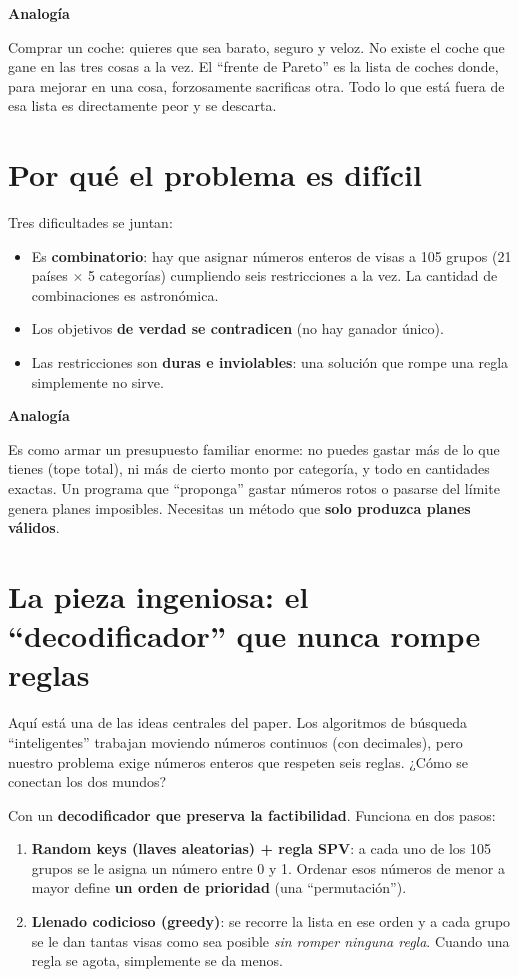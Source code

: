 \documentclass[11pt]{article}
\newcommand{\cajacolor}{cajadato}
\newenvironment{caja}[2]{%
  \par\medskip\noindent
  \renewcommand{\cajacolor}{#1}%
  \begin{lrbox}{\cajabox}%
  \begin{minipage}{\dimexpr\linewidth-2\fboxsep-1.2em\relax}%
  \setlength{\parskip}{0.5em}%
  {\bfseries\color{acento2}#2}\par\smallskip}
  {\end{minipage}%
  \end{lrbox}%
  \setlength{\fboxsep}{0.6em}%
  \colorbox{\cajacolor}{\usebox{\cajabox}}\par\medskip}
\newcommand{\analogia}[1]{\begin{caja}{cajaanalogia}{Analogía}#1\end{caja}}
\newcommand{\term}[1]{\textbf{\color{acento}#1}}
\begin{document}
\analogia{
Comprar un coche: quieres que sea barato, seguro y veloz. No existe el coche que gane en las tres cosas a la vez. El ``frente de Pareto'' es la lista de coches donde, para mejorar en una cosa, forzosamente sacrificas otra. Todo lo que está fuera de esa lista es directamente peor y se descarta.
}

\section{Por qué el problema es difícil}

Tres dificultades se juntan:

\begin{itemize}[leftmargin=1.4em]
  \item Es \term{combinatorio}: hay que asignar números enteros de visas a 105 grupos (21 países $\times$ 5 categorías) cumpliendo seis restricciones a la vez. La cantidad de combinaciones es astronómica.
  \item Los objetivos \term{de verdad se contradicen} (no hay ganador único).
  \item Las restricciones son \term{duras e inviolables}: una solución que rompe una regla simplemente no sirve.
\end{itemize}

\analogia{
Es como armar un presupuesto familiar enorme: no puedes gastar más de lo que tienes (tope total), ni más de cierto monto por categoría, y todo en cantidades exactas. Un programa que ``proponga'' gastar números rotos o pasarse del límite genera planes imposibles. Necesitas un método que \textbf{solo produzca planes válidos}.
}

\section{La pieza ingeniosa: el ``decodificador'' que nunca rompe reglas}

Aquí está una de las ideas centrales del paper. Los algoritmos de búsqueda ``inteligentes'' trabajan moviendo números continuos (con decimales), pero nuestro problema exige números enteros que respeten seis reglas. ¿Cómo se conectan los dos mundos?

Con un \term{decodificador que preserva la factibilidad}. Funciona en dos pasos:

\begin{enumerate}[leftmargin=1.6em]
  \item \textbf{Random keys (llaves aleatorias) + regla SPV}: a cada uno de los 105 grupos se le asigna un número entre 0 y 1. Ordenar esos números de menor a mayor define \textbf{un orden de prioridad} (una ``permutación'').
  \item \textbf{Llenado codicioso (greedy)}: se recorre la lista en ese orden y a cada grupo se le dan tantas visas como sea posible \emph{sin romper ninguna regla}. Cuando una regla se agota, simplemente se da menos.
\end{enumerate}
\end{document}
